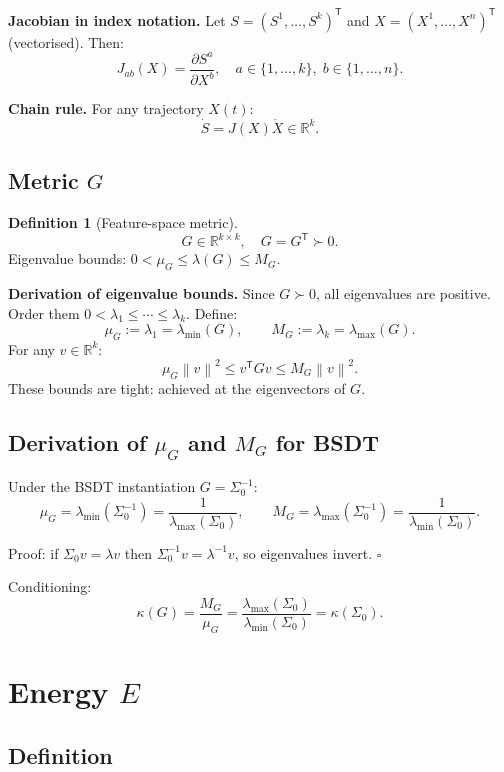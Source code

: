 \documentclass[11pt,a4paper]{article}
\theoremstyle{definition}
\newtheorem{definition}[theorem]{Definition}
\newcommand{\R}{\mathbb{R}}
\newcommand{\T}{^{\mathsf{T}}}
\newcommand{\norm}[1]{\left\|#1\right\|}
\begin{document}
\textbf{Jacobian in index notation.}
Let $S = (S^1,\dots,S^k)\T$ and $X = (X^1,\dots,X^n)\T$ (vectorised). Then:
\[
J_{ab}(X) = \frac{\partial S^a}{\partial X^b}, \quad a \in \{1,\dots,k\},\; b \in \{1,\dots,n\}.
\]

\textbf{Chain rule.} For any trajectory $X(t)$:
\[
\dot S = J(X)\dot X \in \R^k.
\]

\subsection{Metric $G$}

\begin{definition}[Feature-space metric]
\[
G \in \R^{k\times k}, \quad G = G\T \succ 0.
\]
Eigenvalue bounds: $0 < \mu_G \leq \lambda(G) \leq M_G$.
\end{definition}

\textbf{Derivation of eigenvalue bounds.}
Since $G \succ 0$, all eigenvalues are positive. Order them
$0 < \lambda_1 \leq \cdots \leq \lambda_k$.
Define:
\[
\mu_G := \lambda_1 = \lambda_{\min}(G), \qquad M_G := \lambda_k = \lambda_{\max}(G).
\]
For any $v \in \R^k$:
\[
\mu_G \norm{v}^2 \leq v\T G v \leq M_G \norm{v}^2.
\]
These bounds are tight: achieved at the eigenvectors of $G$.

\subsection{Derivation of $\mu_G$ and $M_G$ for BSDT}

Under the BSDT instantiation $G = \Sigma_0^{-1}$:
\[
\mu_G = \lambda_{\min}(\Sigma_0^{-1}) = \frac{1}{\lambda_{\max}(\Sigma_0)},
\qquad
M_G = \lambda_{\max}(\Sigma_0^{-1}) = \frac{1}{\lambda_{\min}(\Sigma_0)}.
\]

Proof: if $\Sigma_0 v = \lambda v$ then $\Sigma_0^{-1} v = \lambda^{-1} v$, so eigenvalues invert. $\square$

Conditioning:
\[
\kappa(G) = \frac{M_G}{\mu_G} = \frac{\lambda_{\max}(\Sigma_0)}{\lambda_{\min}(\Sigma_0)} = \kappa(\Sigma_0).
\]

\section{Energy $E$}

\subsection{Definition}
\end{document}
